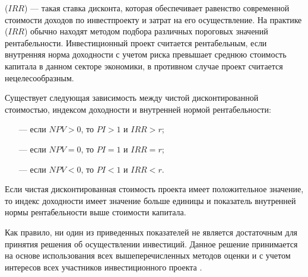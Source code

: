 ($IRR$) --- такая ставка дисконта, которая обеспечивает равенство современной стоимости доходов по инвестпроекту и затрат на его осуществление. На практике ($IRR$) обычно находят методом подбора различных пороговых значений рентабельности. Инвестиционный проект считается рентабельным, если внутренняя норма доходности с учетом риска превышает среднюю стоимость капитала в данном секторе экономики, в противном случае проект считается нецелесообразным.

Существует следующая зависимость между чистой дисконтированной стоимостью, индексом доходности и внутренней нормой рентабельности:
\begin{itemize}
	\item [---] если $NPV > 0$, то $PI > 1$ и $IRR > r$;
	\item [---] если $NPV = 0$, то $PI = 1$ и $IRR = r$;
	\item [---] если $NPV < 0$, то $PI < 1$ и $IRR < r$.
\end{itemize}

Если чистая дисконтированная стоимость проекта имеет положительное значение, то индекс доходности имеет значение больше единицы и показатель внутренней нормы рентабельности выше стоимости капитала.

Как правило, ни один из приведенных показателей не является достаточным для принятия решения об осуществлении инвестиций. Данное решение принимается на основе использования всех вышеперечисленных методов оценки и с учетом интересов всех участников инвестиционного проекта \cite[с. 49--56]{pogodina}.




































































